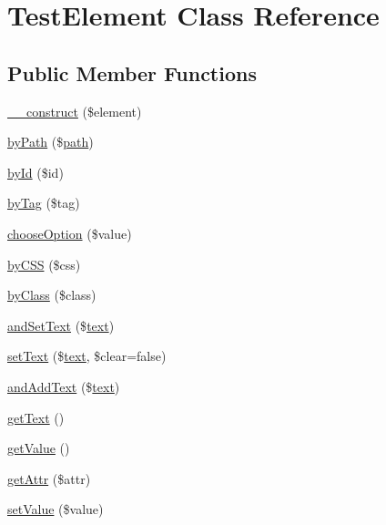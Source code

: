 \hypertarget{classTestElement}{}\section{Test\+Element Class Reference}
\label{classTestElement}
\subsection*{Public Member Functions}
\begin{DoxyCompactItemize}
\item 
\hyperlink{classTestElement_a5555f24285021a20747175e5fa686fbf}{\+\_\+\+\_\+construct} (\$element)
\item 
\hyperlink{classTestElement_ac3025f8014dade5d754d3943689a396f}{by\+Path} (\$\hyperlink{Shape_8php_a3b05eec13add53df44e232273d718ae4}{path})
\item 
\hyperlink{classTestElement_a584de1c2c8c24eb790f493102bcb1fac}{by\+Id} (\$id)
\item 
\hyperlink{classTestElement_a46f9075b924f047895d576e0af82d9c9}{by\+Tag} (\$tag)
\item 
\hyperlink{classTestElement_a56ad09c49ee8c9781b8c50ab31d08b22}{choose\+Option} (\$value)
\item 
\hyperlink{classTestElement_aaf0f757cf4dfc5925d0db204bcb252d5}{by\+C\+S\+S} (\$css)
\item 
\hyperlink{classTestElement_a5211d65c1aa197f6dc1e22e24283abb2}{by\+Class} (\$class)
\item 
\hyperlink{classTestElement_a37b4de38664b658faa86ade0d7073dd4}{and\+Set\+Text} (\$\hyperlink{Shape_8php_a37df362c2f77a0045fa8af094f432238}{text})
\item 
\hyperlink{classTestElement_ac5968c56cb813dba50a15b50946e5330}{set\+Text} (\$\hyperlink{Shape_8php_a37df362c2f77a0045fa8af094f432238}{text}, \$clear=false)
\item 
\hyperlink{classTestElement_a7f2722947e83c9268799ab59294626bc}{and\+Add\+Text} (\$\hyperlink{Shape_8php_a37df362c2f77a0045fa8af094f432238}{text})
\item 
\hyperlink{classTestElement_a86c3a50de5a568d5ca9a75339ef1a417}{get\+Text} ()
\item 
\hyperlink{classTestElement_a1964043ed9be26b977b5ed6b4d993aaa}{get\+Value} ()
\item 
\hyperlink{classTestElement_ad9fd0dc7b25f15c78483e0710dea2d04}{get\+Attr} (\$attr)
\item 
\hyperlink{classTestElement_ae61d3f666ac5c098dec914bcb7fdeaf6}{set\+Value} (\$value)

\end{DoxyCompactItemize}

